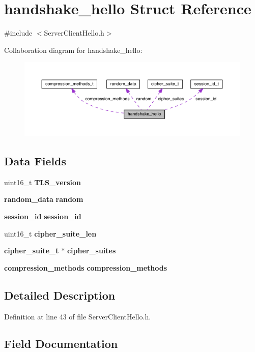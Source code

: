 \section{handshake\+\_\+hello Struct Reference}
\label{structhandshake__hello}


{\ttfamily \#include $<$Server\+Client\+Hello.\+h$>$}



Collaboration diagram for handshake\+\_\+hello\+:\nopagebreak
\begin{figure}[H]
\begin{center}
\leavevmode
\includegraphics[width=350pt]{structhandshake__hello__coll__graph}
\end{center}
\end{figure}
\subsection*{Data Fields}
\begin{DoxyCompactItemize}
\item 
uint16\+\_\+t {\bf T\+L\+S\+\_\+version}
\item 
{\bf random\+\_\+data} {\bf random}
\item 
{\bf session\+\_\+id} {\bf session\+\_\+id}
\item 
uint16\+\_\+t {\bf cipher\+\_\+suite\+\_\+len}
\item 
{\bf cipher\+\_\+suite\+\_\+t} $\ast$ {\bf cipher\+\_\+suites}
\item 
{\bf compression\+\_\+methods} {\bf compression\+\_\+methods}
\end{DoxyCompactItemize}


\subsection{Detailed Description}


Definition at line 43 of file Server\+Client\+Hello.\+h.



\subsection{Field Documentation}
